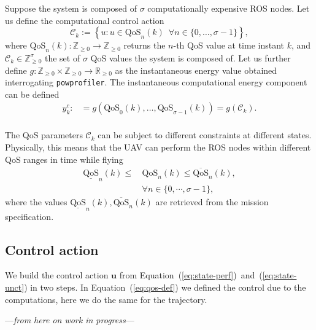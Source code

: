 \documentclass[letterpaper,10pt,conference]{ieeeconf}
\newcommand{\stt}[1]{{\small\tt #1}} %
\newcommand{\powprof}{\stt{powprofiler}}
\begin{document}
Suppose the system is composed of $\sigma$ computationally expensive ROS nodes. Let us define the computational control action
\begin{equation}\label{eq:qos-def}
  \mathcal{C}_k:=\left\{u:u\in\text{QoS}_n(k)\,\,\,\forall n\in\{0,\dots,\sigma-1\}\right\},
\end{equation}
where $\text{QoS}_n(k):\mathbb{Z}_{\geq 0}\rightarrow\mathbb{Z}_{\geq 0}$ returns the $n$-th QoS value at time instant $k$, and $\mathcal{C}_k\in\mathbb{Z}_{\geq 0}^\sigma$ the set of $\sigma$ QoS values the system is composed of. Let us further define $g:\mathbb{Z}_{\geq 0}\times\mathbb{Z}_{\geq 0}\rightarrow\mathbb{R}_{\geq 0}$ as the instantaneous energy value obtained interrogating \powprof{}. The instantaneous computational energy component can be defined
\begin{equation}\label{eq:energy-comp}\begin{split}
  y_k^c:&=g\left(\text{QoS}_0\left(k\right),\dots,\text{QoS}_{\sigma-1}\left(k\right)\right)=g\left(\mathcal{C}_{k}\right).\\
\end{split}\end{equation}

The QoS parameters $\mathcal{C}_k$ can be subject to different constraints at different states. Physically, this means that the UAV can perform the ROS nodes within different QoS ranges in time while flying
\begin{equation}\label{eq:qos-lims}\begin{split}
  \underline{\text{QoS}}_n(k)\leq \,&\text{QoS}_n(k)\leq \overline{\text{QoS}}_n(k),\\
  &\forall n\in\{0,\cdots,\sigma-1\},
\end{split}\end{equation}
where the values $\underline{\text{QoS}}_n(k),\overline{\text{QoS}}_n(k)$ are retrieved from the mission specification.

\subsection{Control action}
\label{sec:control-action}

We build the control action $\mathbf{u}$ from Equation~(\ref{eq:state-perf})~and~(\ref{eq:state-unct}) in two steps. In Equation~(\ref{eq:qos-def}) we defined the control due to the computations, here we do the same for the trajectory.

\begin{center}\vspace{.2cm}---\emph{from here on work in progress}---\vspace{.6cm}\end{center}
\end{document}
